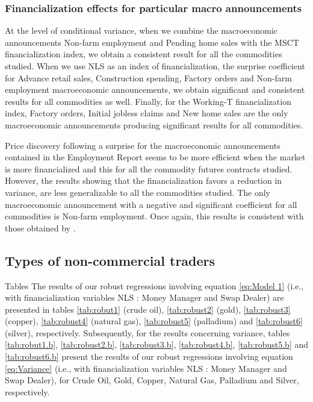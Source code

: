 \documentclass[12pt]{article}
\begin{document}
	
	\subsubsection{Financialization effects for particular macro announcements}
At the level of conditional variance, when we combine the macroeconomic announcements Non-farm employment and Pending home sales with the MSCT financialization index, we obtain a consistent result for all the commodities studied. When we use NLS as an index of financialization, the surprise coefficient for Advance retail sales, Construction spending, Factory orders and Non-farm employment macroeconomic announcements, we obtain significant and consistent results for all commodities as well.
Finally, for the Working-T financialization index, Factory orders, Initial jobless claims and New home sales are the only macroeconomic announcements producing significant results for all commodities.

 
 
Price discovery following a surprise for the macroeconomic announcements contained in the Employment Report seems to be more efficient when the market is more financialized and this for all the commodity futures contracts studied. However, the results showing that the financialization favors a reduction in variance, are less generalizable to all the commodities studied. The only macroeconomic announcement with a negative and significant coefficient for all commodities is Non-farm employment. Once again, this results is consistent with those obtained by \citet{hordahl2015expectations}.

\subsection{Types of non-commercial traders}
 Tables
The results of our robust regressions involving equation \ref{eq:Model 1} (i.e., with financialization variables NLS : Money Manager and Swap Dealer) are presented in tables  \ref{tab:robut1} (crude oil), \ref{tab:robust2} (gold), \ref{tab:robust3} (copper), \ref{tab:robust4} (natural gas), \ref{tab:robust5} (palladium) and \ref{tab:robust6} (silver), respectively.  
 Subsequently, for the results concerning  variance, tables \ref{tab:robut1.b}, \ref{tab:robust2.b}, \ref{tab:robust3.b}, \ref{tab:robust4.b}, \ref{tab:robust5.b} and \ref{tab:robust6.b} present the results of our robust regressions involving equation \ref{eq:Variance} (i.e., with financialization variables NLS : Money Manager and Swap Dealer), for Crude Oil, Gold, Copper, Natural Gas, Palladium and Silver, respectively.
 
\end{document}

